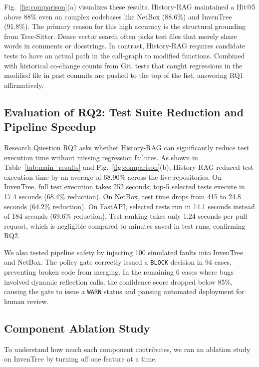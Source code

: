 \documentclass[12pt,onecolumn,draftclsnofoot]{IEEEtran}
\begin{document}
Fig.~\ref{fig:comparison}(a) visualizes these results. History-RAG maintained a Hit@5 above 88\% even on complex codebases like NetBox (88.6\%) and InvenTree (91.8\%). The primary reason for this high accuracy is the structural grounding from Tree-Sitter. Dense vector search often picks test files that merely share words in comments or docstrings. In contrast, History-RAG requires candidate tests to have an actual path in the call-graph to modified functions. Combined with historical co-change counts from Git, tests that caught regressions in the modified file in past commits are pushed to the top of the list, answering RQ1 affirmatively.

\subsection{Evaluation of RQ2: Test Suite Reduction and Pipeline Speedup}
Research Question RQ2 asks whether History-RAG can significantly reduce test execution time without missing regression failures. As shown in Table~\ref{tab:main_results} and Fig.~\ref{fig:comparison}(b), History-RAG reduced test execution time by an average of 68.90\% across the five repositories. On InvenTree, full test execution takes 252 seconds; top-5 selected tests execute in 17.4 seconds (68.4\% reduction). On NetBox, test time drops from 415 to 24.8 seconds (64.2\% reduction). On FastAPI, selected tests run in 14.1 seconds instead of 184 seconds (69.6\% reduction). Test ranking takes only 1.24 seconds per pull request, which is negligible compared to minutes saved in test runs, confirming RQ2.

We also tested pipeline safety by injecting 100 simulated faults into InvenTree and NetBox. The policy gate correctly issued a \texttt{BLOCK} decision in 94 cases, preventing broken code from merging. In the remaining 6 cases where bugs involved dynamic reflection calls, the confidence score dropped below 85\%, causing the gate to issue a \texttt{WARN} status and pausing automated deployment for human review.

\subsection{Component Ablation Study}
To understand how much each component contributes, we ran an ablation study on InvenTree by turning off one feature at a time.
\end{document}
